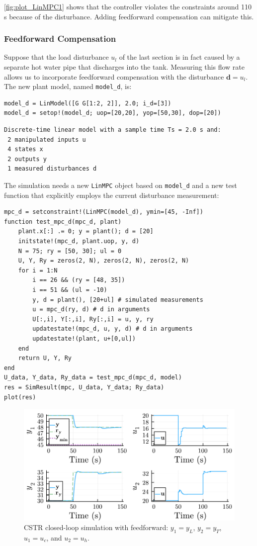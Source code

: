 \cref{fig:plot_LinMPC1} shows that the controller violates the constraints around 110 s because of the disturbance. Adding feedforward compensation can mitigate this.

\subsubsection{Feedforward Compensation}

Suppose that the load disturbance $u_l$ of the last section is in fact caused by a separate hot water pipe that discharges into the tank. Measuring this flow rate allows us to incorporate feedforward compensation with the disturbance $\mathbf{d}=u_l$. The new plant model, named \texttt{model\_d}, is:

\begin{verbatim}
model_d = LinModel([G G[1:2, 2]], 2.0; i_d=[3])
model_d = setop!(model_d; uop=[20,20], yop=[50,30], dop=[20])
\end{verbatim}
\spacerepl
\begin{verbatim}
Discrete-time linear model with a sample time Ts = 2.0 s and:
 2 manipulated inputs u
 4 states x
 2 outputs y
 1 measured disturbances d
\end{verbatim}
The simulation needs a new \texttt{LinMPC} object based on \texttt{model\_d} and a new test function that explicitly employs the current disturbance measurement:
\begin{verbatim}
mpc_d = setconstraint!(LinMPC(model_d), ymin=[45, -Inf])
function test_mpc_d(mpc_d, plant)
    plant.x[:] .= 0; y = plant(); d = [20]
    initstate!(mpc_d, plant.uop, y, d)
    N = 75; ry = [50, 30]; ul = 0
    U, Y, Ry = zeros(2, N), zeros(2, N), zeros(2, N)
    for i = 1:N
        i == 26 && (ry = [48, 35])
        i == 51 && (ul = -10)
        y, d = plant(), [20+ul] # simulated measurements
        u = mpc_d(ry, d) # d in arguments
        U[:,i], Y[:,i], Ry[:,i] = u, y, ry
        updatestate!(mpc_d, u, y, d) # d in arguments
        updatestate!(plant, u+[0,ul])
    end
    return U, Y, Ry
end
U_data, Y_data, Ry_data = test_mpc_d(mpc_d, model)
res = SimResult(mpc, U_data, Y_data; Ry_data)
plot(res)
\end{verbatim}

\begin{figure}[t]
    \centering
    \includegraphics[width=\columnwidth]{fig/plot_LinMPC2.pdf}
    \caption{CSTR closed-loop simulation with feedforward: $y_1=y_L$, $y_2=y_T$, $u_1=u_c$, and $u_2=u_h$.}
    \label{fig:plot_LinMPC2}
\end{figure}

